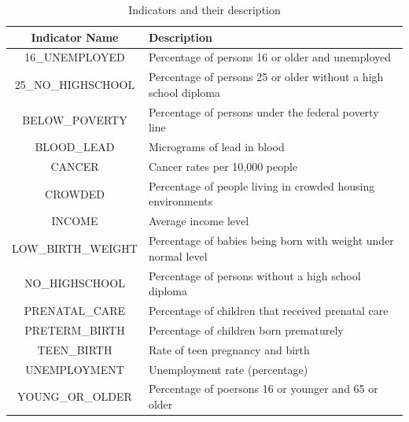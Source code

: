 \documentclass[a4paper,10pt]{article}
\begin{document}
\begin{table}
	\begin{tabular}{|c|l|}
	\hline 
	\textbf{Indicator Name} & \textbf{Description} \\ 
	\hline 
	16\_UNEMPLOYED & Percentage of persons 16 or older and unemployed \\\hline
25\_NO\_HIGHSCHOOL & Percentage of persons 25 or older without a high school diploma \\\hline
BELOW\_POVERTY & Percentage of persons under the federal poverty line\\\hline
BLOOD\_LEAD & Micrograms of lead in blood\\\hline
CANCER & Cancer rates per 10,000 people\\\hline
CROWDED & Percentage of people living in crowded housing environments\\\hline
INCOME & Average income level\\\hline
LOW\_BIRTH\_WEIGHT & Percentage of babies being born with weight under normal level\\\hline
NO\_HIGHSCHOOL & Percentage of persons without a high school diploma\\\hline
PRENATAL\_CARE & Percentage of children that received prenatal care\\\hline
PRETERM\_BIRTH & Percentage of children born prematurely\\\hline
TEEN\_BIRTH & Rate of teen pregnancy and birth\\\hline
UNEMPLOYMENT & Unemployment rate (percentage)\\\hline
YOUNG\_OR\_OLDER & Percentage of poersons 16 or younger and 65 or older \\
\hline
	\end{tabular} 
	\caption{Indicators and their description}
\end{table}
\end{document}
